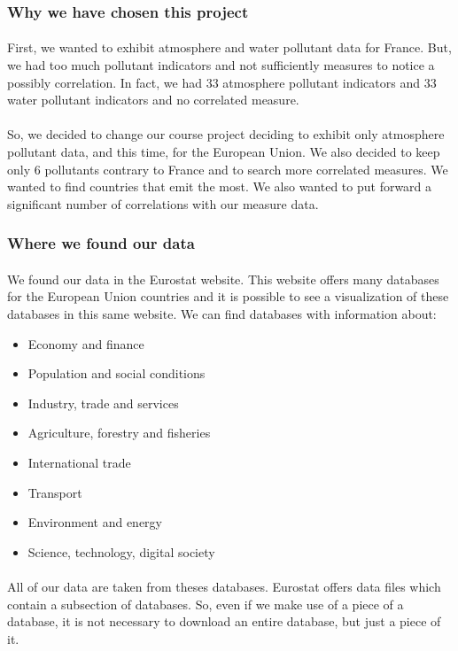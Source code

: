 \documentclass[preprint,journal]{vgtc}       %
\begin{document}
		\subsubsection{Why we have chosen this project}
		\paragraph{}
First, we wanted to exhibit atmosphere and water pollutant data for France. But, we had too much pollutant indicators and not sufficiently measures to notice a possibly correlation. In fact, we had  33 atmosphere pollutant indicators and 33 water pollutant indicators and no correlated measure.		
		\paragraph{}
So, we decided to change our course project deciding to exhibit only atmosphere pollutant data, and this time, for the European Union. We also decided to keep only 6 pollutants contrary to France and to search more correlated measures. We wanted to find countries that emit the most. We also wanted to put forward a significant number of correlations with our measure data.		
		\subsubsection{Where we found our data}
		\paragraph{}
We found our data in the Eurostat website. This website offers many databases for the European Union countries and it is possible to see a visualization of these databases in this same website. We can find databases with information about:
\begin{itemize}[parsep=0cm,itemsep=0cm]
\item Economy and finance
\item Population and social conditions
\item Industry, trade and services
\item Agriculture, forestry and fisheries
\item International trade
\item Transport
\item Environment and energy
\item Science, technology, digital society
\end{itemize}
\paragraph{}
All of our data are taken from theses databases. Eurostat offers data files which contain a subsection of databases. So, even if we make use of a piece of a database, it is not necessary to download an entire database, but just a piece of it.
\end{document}
